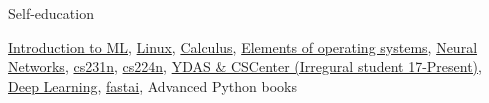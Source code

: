 \documentclass{resume} %
\begin{document}
\vspace{-1.5\baselineskip}
\begin{rSection}{Self-education}
\vspace{-0.3\baselineskip}

\href{https://www.coursera.org/learn/vvedenie-mashinnoe-obuchenie}{Introduction to ML}, \href{https://stepik.org/course/73}{Linux}, \href{https://stepik.org/course/95}{Calculus}, \href{https://stepik.org/course/253}{Elements of operating systems}, \href{https://stepik.org/course/401/}{Neural Networks}, \href{http://cs231n.stanford.edu/}{cs231n}, \href{http://web.stanford.edu/class/cs224n/}{cs224n}, \href{https://yandexdataschool.ru}{YDAS \& CSCenter (Irregural student 17-Present)}, \href{https://www.deeplearningbook.org}{Deep Learning}, \href{http://course.fast.ai}{fastai}, Advanced Python books

\end{rSection} 
\end{document}
